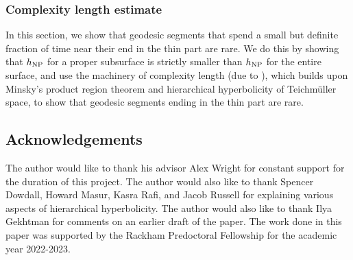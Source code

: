 \subsubsection*{Complexity length estimate}

In this section, we
show that geodesic segments that spend a small but definite fraction of time near their end in the thin part are rare.
We do this by showing that $h_{\mathrm{NP}}$ for a proper subsurface is strictly smaller than $h_{\mathrm{NP}}$ for the entire surface, and use the machinery of complexity length (due to \textcite{dowdall2023lattice}), which builds upon Minsky's product region theorem and hierarchical hyperbolicity of Teichmüller space, to show that geodesic segments ending in the thin part are rare.

\subsection*{Acknowledgements}

The author would like to thank his advisor Alex Wright for constant support for the duration of this project.
The author would also like to thank Spencer Dowdall, Howard Masur, Kasra Rafi, and Jacob Russell for explaining various aspects of hierarchical hyperbolicity.
The author would also like to thank Ilya Gekhtman for comments on an earlier draft of the paper.
The work done in this paper was supported by the Rackham Predoctoral Fellowship for the academic year 2022-2023.




